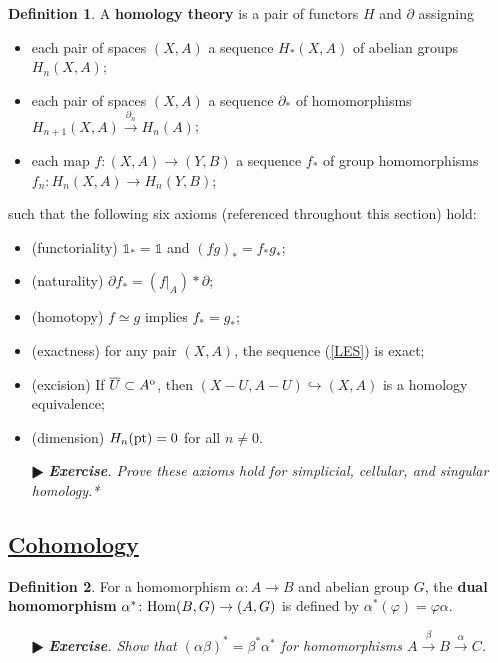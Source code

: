 \documentclass[11pt]{amsart}
\theoremstyle{definition}
\newtheorem*{definition*}{Definition}
\renewcommand\:{\colon}
\renewcommand\bar[1]{\overline{#1}}
\newcommand{\1}{\mathds{1}}
\newcommand{\Hom}{\textnormal{Hom}}
\newcommand{\exc}[1]{\vspace{-2.5pt}\begin{itemize}[leftmargin=15pt]\item[$\RHD$] \textit{\textbf{Exercise}. #1}\end{itemize}}
\begin{document}
\begin{definition*}
	A \textbf{homology theory} is a pair of functors $H$ and $\partial$ assigning
	\begin{itemize}[leftmargin=15pt]\setlength\itemsep{0em}
		\item each pair of spaces $(X, A)$ a sequence $H_*(X, A)$ of abelian groups $H_n(X, A)$;
		\item each pair of spaces $(X, A)$ a sequence $\partial_*$ of homomorphisms $H_{n+1}(X, A) \xrightarrow{\partial_n} H_n(A)$;
		\item each map $f\: (X, A) \to (Y, B)$ a sequence $f_*$ of group homomorphisms $f_n\: H_n(X, A) \to H_n(Y, B)$;
	\end{itemize}
	such that the following six axioms (referenced throughout this section) hold:
	\begin{itemize}[leftmargin=15pt]\setlength\itemsep{0em}
		\item (functoriality) $\1_* = \1$ and $(fg)_* = f_*g_*$;
		\item (naturality) $\partial f_* = (f|_A)*\partial$;
		\item (homotopy) $f \simeq g$ implies $f_* = g_*$;
		\item (exactness) for any pair $(X, A)$, the sequence (\ref{LES}) is exact;
		\item (excision) If $\bar U \subset A^\textnormal{o}$, then $(X - U, A - U) \hookrightarrow (X, A)$ is a homology equivalence;
		\item (dimension) $H_n(\textnormal{pt}) = 0$ for all $n \neq 0$.
	\end{itemize}
\end{definition*}

\exc{Prove these axioms hold for simplicial, cellular, and singular homology.*}

\vskip20pt



\subsection*{\underline{Cohomology}}

\begin{definition*}
	For a homomorphism $\alpha\: A \to B$ and abelian group $G$, the \textbf{dual homomorphism} $\alpha^*\: \Hom(B, G) \to (A, G)$ is defined by $\alpha^*(\varphi) = \varphi\alpha$.
\end{definition*}

\exc{Show that $(\alpha\beta)^* = \beta^*\alpha^*$ for homomorphisms $A \xrightarrow{\beta} B \xrightarrow{\alpha} C$.}
\end{document}
